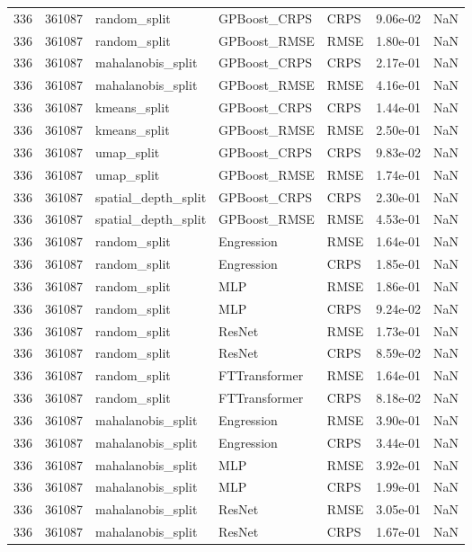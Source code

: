 \begin{tabular}{rrlllrr}
336 & 361087 & random\_split & GPBoost\_CRPS & CRPS & 9.06e-02 & NaN \\
336 & 361087 & random\_split & GPBoost\_RMSE & RMSE & 1.80e-01 & NaN \\
336 & 361087 & mahalanobis\_split & GPBoost\_CRPS & CRPS & 2.17e-01 & NaN \\
336 & 361087 & mahalanobis\_split & GPBoost\_RMSE & RMSE & 4.16e-01 & NaN \\
336 & 361087 & kmeans\_split & GPBoost\_CRPS & CRPS & 1.44e-01 & NaN \\
336 & 361087 & kmeans\_split & GPBoost\_RMSE & RMSE & 2.50e-01 & NaN \\
336 & 361087 & umap\_split & GPBoost\_CRPS & CRPS & 9.83e-02 & NaN \\
336 & 361087 & umap\_split & GPBoost\_RMSE & RMSE & 1.74e-01 & NaN \\
336 & 361087 & spatial\_depth\_split & GPBoost\_CRPS & CRPS & 2.30e-01 & NaN \\
336 & 361087 & spatial\_depth\_split & GPBoost\_RMSE & RMSE & 4.53e-01 & NaN \\
336 & 361087 & random\_split & Engression & RMSE & 1.64e-01 & NaN \\
336 & 361087 & random\_split & Engression & CRPS & 1.85e-01 & NaN \\
336 & 361087 & random\_split & MLP & RMSE & 1.86e-01 & NaN \\
336 & 361087 & random\_split & MLP & CRPS & 9.24e-02 & NaN \\
336 & 361087 & random\_split & ResNet & RMSE & 1.73e-01 & NaN \\
336 & 361087 & random\_split & ResNet & CRPS & 8.59e-02 & NaN \\
336 & 361087 & random\_split & FTTransformer & RMSE & 1.64e-01 & NaN \\
336 & 361087 & random\_split & FTTransformer & CRPS & 8.18e-02 & NaN \\
336 & 361087 & mahalanobis\_split & Engression & RMSE & 3.90e-01 & NaN \\
336 & 361087 & mahalanobis\_split & Engression & CRPS & 3.44e-01 & NaN \\
336 & 361087 & mahalanobis\_split & MLP & RMSE & 3.92e-01 & NaN \\
336 & 361087 & mahalanobis\_split & MLP & CRPS & 1.99e-01 & NaN \\
336 & 361087 & mahalanobis\_split & ResNet & RMSE & 3.05e-01 & NaN \\
336 & 361087 & mahalanobis\_split & ResNet & CRPS & 1.67e-01 & NaN \\

\end{tabular}
